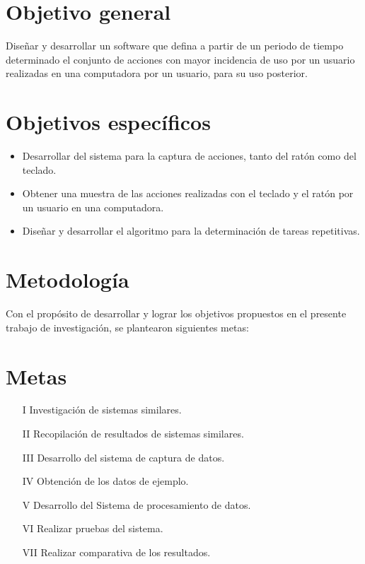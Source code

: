 \section{Objetivo general} 
Diseñar y desarrollar un software que defina a partir de un periodo de tiempo
 determinado el conjunto de acciones con mayor incidencia de uso por un usuario
 realizadas en una computadora por un usuario, para su uso posterior.

\section{Objetivos específicos}
\begin{itemize}
  \item Desarrollar del sistema para la captura de acciones, tanto del  ratón
  como del teclado.
  \item Obtener una muestra de las acciones realizadas con el teclado y el 
  ratón por un usuario en una computadora.
  \item Diseñar y desarrollar el algoritmo para la determinación de tareas
  repetitivas.
\end{itemize}


\section{Metodología}
Con el propósito de desarrollar y lograr los objetivos propuestos en el presente trabajo de investigación, se plantearon siguientes metas:
\section*{Metas}
\begin{itemize}
  \item[I] Investigación de sistemas similares.
  \item[II] Recopilación de resultados de sistemas similares.
  \item[III] Desarrollo del sistema  de captura de datos.
  \item[IV] Obtención de los datos de ejemplo.
  \item[V] Desarrollo del Sistema de procesamiento de datos.
  \item[VI] Realizar pruebas del sistema.
  \item[VII] Realizar comparativa de los resultados.
\end{itemize}





